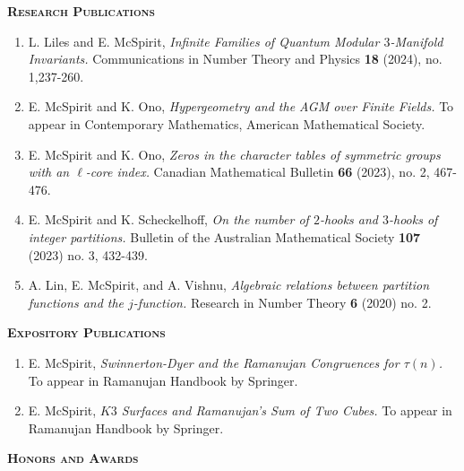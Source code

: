 \documentclass[11pt]{amsart}
\theoremstyle{remark}
\begin{document}
{{{\vspace{.1in}





\large{\textbf{\textsc{Research Publications}}}
\begin{enumerate}[label=\arabic*.]
\item L. Liles and E. McSpirit, \textit{Infinite Families of Quantum Modular $3$-Manifold Invariants.} Communications in Number Theory and Physics \textbf{18} (2024), no. 1,237-260.  
\item E. McSpirit and K. Ono, \textit{Hypergeometry and the AGM over Finite Fields.} To appear in Contemporary Mathematics, American Mathematical Society. 
\item E. McSpirit and K. Ono, \textit{Zeros in the character tables of symmetric groups with an $\ell$-core index.} Canadian Mathematical Bulletin \textbf{66} (2023), no. 2, 467-476.
\item E. McSpirit and K. Scheckelhoff, \textit{On the number of $2$-hooks and $3$-hooks of integer partitions.} Bulletin of the Australian Mathematical Society \textbf{107} (2023) no. 3, 432-439.
\item A. Lin, E. McSpirit, and A. Vishnu, \textit{Algebraic relations between partition functions and the $j$-function.} Research in Number Theory \textbf{6} (2020) no. 2.
\end{enumerate}

\vspace{.1in}

\large{\textbf{\textsc{Expository Publications}}}
\begin{enumerate}[label=\arabic*.]
\item E. McSpirit, \textit{Swinnerton-Dyer and the Ramanujan Congruences for $\tau(n)$.} To appear in Ramanujan Handbook by Springer.
\item  E. McSpirit, \textit{$K3$ Surfaces and Ramanujan's Sum of Two Cubes.} To appear in Ramanujan Handbook by Springer.
\end{enumerate}

\vspace{.1in}

\newpage

\large{\textbf{\textsc{Honors and Awards}}}

}}}
\end{document}
